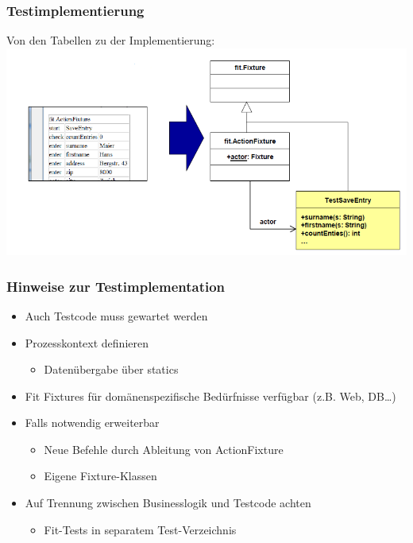 \documentclass[a4paper,10pt]{article}
\begin{document}
\subsubsection{Testimplementierung}
Von den Tabellen zu der Implementierung:\\
\includegraphics[scale=0.6]{FIT_TestImplementierung.png}

\subsubsection{Hinweise zur Testimplementation}
\begin{itemize}
\item Auch Testcode muss gewartet werden
\item Prozesskontext definieren
	\begin{itemize}
		\item Daten\"ubergabe \"uber statics 
	\end{itemize}
\item Fit Fixtures f\"ur dom\"anenspezifische Bed\"urfnisse verf\"ugbar (z.B. Web, DB…)
\item Falls notwendig erweiterbar
	\begin{itemize}
		\item Neue Befehle durch Ableitung von ActionFixture
		\item Eigene Fixture-Klassen
	\end{itemize}
\item Auf Trennung zwischen Businesslogik und Testcode achten
	\begin{itemize}
		\item Fit-Tests in separatem Test-Verzeichnis
	\end{itemize}
\end{itemize}

\newpage
\end{document}
